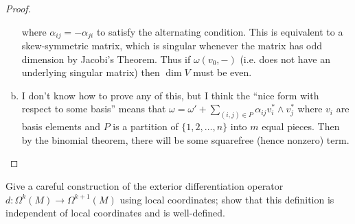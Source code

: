 \documentclass{article}
\newenvironment{problem}[2][Problem]{\begin{trivlist}
\item[\hskip \labelsep {\bfseries #1}\hskip \labelsep {\bfseries #2.}]}{\end{trivlist}}
\begin{document}
\begin{proof}
\begin{enumerate}[(a)]
\[      \] where $\alpha_{ij} = -\alpha_{ji}$ to satisfy the alternating condition.
      This is equivalent to a skew-symmetric matrix, which is singular whenever
      the matrix has odd dimension by Jacobi's Theorem.
      Thus if $\omega(v_0, -)$ (i.e. does not have an underlying singular
      matrix) then $\dim V$ must be even.
    \item
    I don't know how to prove any of this, but I think the ``nice form with
    respect to some basis'' means that
    $\omega = \omega' + \sum_{(i, j) \in P} \alpha_{ij} v_{i}^* \wedge v_{j}^*$
    where $v_i$ are basis elements and $P$ is a partition of
    $\{ 1, 2, \hdots, n\}$ into $m$ equal pieces. Then by the binomial theorem, there will be some squarefree (hence nonzero)
    term.
  \end{enumerate}
\end{proof}

\pagebreak

\begin{problem}{4}
  Give a careful construction of the exterior differentiation operator
  $d\colon \Omega^k(M) \rightarrow \Omega^{k+1}(M)$ using local coordinates;
  show that this definition is independent of local coordinates and is
  well-defined.
\end{problem}
\end{document}
